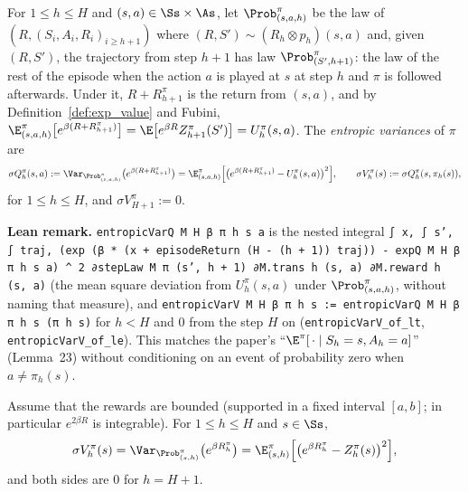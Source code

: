 \begin{definition}\label{def:entropic_variance}
\leanok
{}
For $1 \le h \le H$ and $(s, a) \in \Ss \times \As$, let $\Prob^\pi_{(s,a,h)}$ be the law of
$(R, (S_i, A_i, R_i)_{i \ge h+1})$ where $(R, S') \sim (R_h \otimes p_h)(s, a)$ and, given
$(R, S')$, the trajectory from step $h + 1$ has law $\Prob^\pi_{(S', h+1)}$: the law of the
rest of the episode when the action $a$ is played at $s$ at step $h$ and $\pi$ is followed
afterwards. Under it, $R + R^\pi_{h+1}$ is the return from $(s, a)$, and by
Definition~\ref{def:exp_value} and Fubini,
$\E^\pi_{(s,a,h)}\big[e^{\beta(R + R^\pi_{h+1})}\big] = \E\big[e^{\beta R}Z^\pi_{h+1}(S')\big] = U^\pi_h(s,a)$.
The \emph{entropic variances} of $\pi$ are
\[
  \sigma Q^\pi_h(s, a) := \Var_{\Prob^\pi_{(s,a,h)}}\big(e^{\beta(R + R^\pi_{h+1})}\big)
  = \E^\pi_{(s,a,h)}\Big[\big(e^{\beta(R + R^\pi_{h+1})} - U^\pi_h(s,a)\big)^2\Big],
  \qquad
  \sigma V^\pi_h(s) := \sigma Q^\pi_h(s, \pi_h(s)),
\]
for $1 \le h \le H$, and $\sigma V^\pi_{H+1} := 0$.
\end{definition}

\textbf{Lean remark.} \texttt{entropicVarQ M H β π h s a} is the nested integral
\texttt{∫ x, ∫ s', ∫ traj, (exp (β * (x + episodeReturn (H - (h + 1)) traj)) - expQ M H β π h s a) \^{} 2 ∂stepLaw M π (s', h + 1) ∂M.trans h (s, a) ∂M.reward h (s, a)}
(the mean square deviation from $U^\pi_h(s,a)$ under $\Prob^\pi_{(s,a,h)}$, without naming that
measure), and \texttt{entropicVarV M H β π h s := entropicVarQ M H β π h s (π h s)} for $h < H$ and
$0$ from the step $H$ on (\texttt{entropicVarV\_of\_lt}, \texttt{entropicVarV\_of\_le}). This matches the
paper's ``$\E^\pi[\,\cdot \mid S_h = s, A_h = a]$'' (Lemma~23) without conditioning on an event
of probability zero when $a \ne \pi_h(s)$.

\begin{lemma}\label{lem:pmdp_entropic_variance_V}
\leanok
{}
Assume that the rewards are bounded (supported in a fixed interval $[a, b]$; in particular
$e^{2\beta R}$ is integrable). For $1 \le h \le H$ and $s \in \Ss$,
\[
  \sigma V^\pi_h(s) = \Var_{\Prob^\pi_{(s,h)}}\big(e^{\beta R^\pi_h}\big)
  = \E^\pi_{(s,h)}\Big[\big(e^{\beta R^\pi_h} - Z^\pi_h(s)\big)^2\Big] ,
\]
and both sides are $0$ for $h = H + 1$.
\end{lemma}

